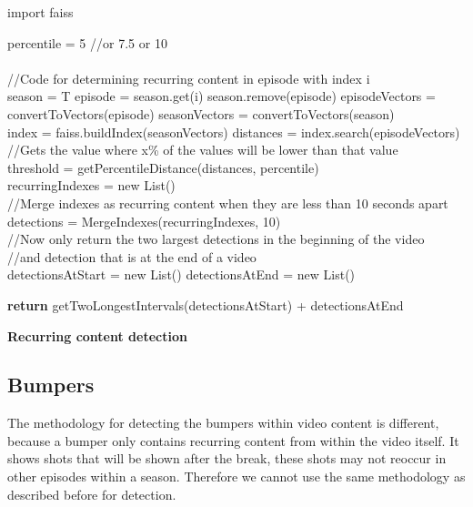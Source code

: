 \documentclass{report}
\begin{document}
\begin{algorithm}[h] 
	\SetAlgoLined
	
	import faiss
	
	percentile = 5 //or 7.5 or 10
	\texttt{\\}
	\texttt{\\}
	//Code for determining recurring content in episode with index i \\
	season = T\;
	episode = season.get(i)\;
	season.remove(episode)\;
	episodeVectors = convertToVectors(episode)\;
	seasonVectors = convertToVectors(season)\;
	\texttt{\\}
	index = faiss.buildIndex(seasonVectors)\;
	distances = index.search(episodeVectors)\;
	\texttt{\\}
	//Gets the value where x\% of the values will be lower than that value \\
	threshold = getPercentileDistance(distances, percentile)\;
	\texttt{\\}
	recurringIndexes = new List()\;
	\texttt{\\}
	//Merge indexes as recurring content when they are less than 10 seconds apart \\
	detections = MergeIndexes(recurringIndexes, 10)\;
	\texttt{\\}
	//Now only return the two largest detections in the beginning of the video \\
	//and detection that is at the end of a video \\
	detectionsAtStart = new List()\;
	detectionsAtEnd = new List()\;

	\textbf{return} getTwoLongestIntervals(detectionsAtStart) + detectionsAtEnd

	\caption{\textbf{Recurring content detection}}
	\label{algorithm:recurring}
\end{algorithm}

\subsection{Bumpers}
The methodology for detecting the bumpers within video content is different, because a bumper only contains recurring content from within the video itself. It shows shots that will be shown after the break, these shots may not reoccur in other episodes within a season. Therefore we cannot use the same methodology as described before for detection.
\end{document}
